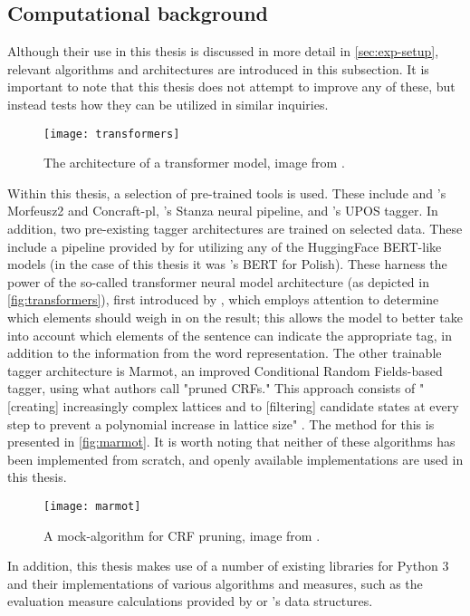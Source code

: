 \subsection{Computational background}
\label{subsec:algorithms}

Although their use in this thesis is discussed in more detail in \autoref{sec:exp-setup}, relevant algorithms and architectures are introduced in this subsection. It is important to note that this thesis does not attempt to improve any of these, but instead tests how they can be utilized in similar inquiries. 

\begin{figure}[H]
\centering
\texttt{[image: transformers]}
\caption{\label{fig:transformers} The architecture of a transformer model, image from \citet{vaswani2017attention}.}
\end{figure}

Within this thesis, a selection of pre-trained tools is used. These include \cite{waszczuk-2012-harnessing} and \citet{kie:wol:17:morf}'s Morfeusz2 and Concraft-pl, \citet{qi2020stanza}'s Stanza neural pipeline, and \citet{gatecloud}'s UPOS tagger. In addition, two pre-existing tagger architectures are trained on selected data. These include a pipeline provided by \citet{wolf-etal-2020-transformers} for utilizing any of the HuggingFace BERT-like models (in the case of this thesis it was \citet{kłeczek_2021}'s BERT for Polish). These harness the power of the so-called transformer neural model architecture (as depicted in \autoref{fig:transformers}), first introduced by \citet{vaswani2017attention}, which employs attention to determine which elements should weigh in on the result; this allows the model to better take into account which elements of the sentence can indicate the appropriate tag, in addition to the information from the word representation. The other trainable tagger architecture is Marmot, an improved Conditional Random Fields-based tagger, using what authors call "pruned CRFs." This approach consists of "[creating] increasingly complex lattices and to [filtering] candidate states at every step to prevent a polynomial increase in lattice size" \citep{mueller-etal-2013-efficient}. The method for this is presented in \autoref{fig:marmot}. It is worth noting that neither of these algorithms has been implemented from scratch, and openly available implementations are used in this thesis. 

\begin{figure}[H]
\centering
\texttt{[image: marmot]}
\caption{\label{fig:marmot} A mock-algorithm for CRF pruning, image from \citet{mueller-etal-2013-efficient}.}
\end{figure}

In addition, this thesis makes use of a number of existing libraries for Python 3 and their implementations of various algorithms and measures, such as the evaluation measure calculations provided by \citet{scikit-learn} or \citet{reback2020pandas}'s data structures. 